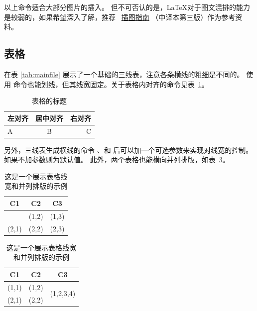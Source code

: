 以上命令适合大部分图片的插入。
但不可否认的是，\LaTeX{}对于图文混排的能力是较弱的，如果希望深入了解，推荐~
\href{https://github.com/WenboSheng/epslatex-cn}{\LaTeXe 插图指南}
（中译本第三版）作为参考资料。


\subsection{表格}\label{subsec:tab}
在表 \ref{tab:mainfile} 展示了一个基础的三线表，注意各条横线的粗细是不同的。
使用 命令也能划线，但其线宽固定。关于表格内对齐的命令见表~\ref{tab:lcr}。
\begin{table}[H]
	\centering
	\caption{表格的标题}\label{tab:lcr}
	\begin{tabular}{lcr}
		\hline
		左对齐 & 居中对齐 & 右对齐 \\
		\hline
		A      & B        & C      \\
		\hline
	\end{tabular}
\end{table}

另外，三线表生成横线的命令 、和
后可以加一个可选参数来实现对线宽的控制。
如果不加参数则为默认值。
此外，两个表格也能横向并列排版，如表~\ref{tab:2tab}。

\begin{table}[H]
	\centering
	\caption{这是一个展示表格线宽和并列排版的示例}
	\label{tab:2tab}
	\begin{tabular}{ccc}
		\toprule[1.5pt]
		C1    & C2    & C3    \\\midrule[1pt]
		(1,1) & (1,2) & (1,3) \\
		(2,1) & (2,2) & (2,3) \\\midrule[1pt]
	\end{tabular}
	\hspace{1cm}
	\begin{tabular}{ccc}
		\midrule
		C1    & C2    & C3                         \\\toprule
		(1,1) & (1,2) & \multirow{2}{*}{(1,2,3,4)} \\
		(2,1) & (2,2) &                            \\\bottomrule
	\end{tabular}
\end{table}

